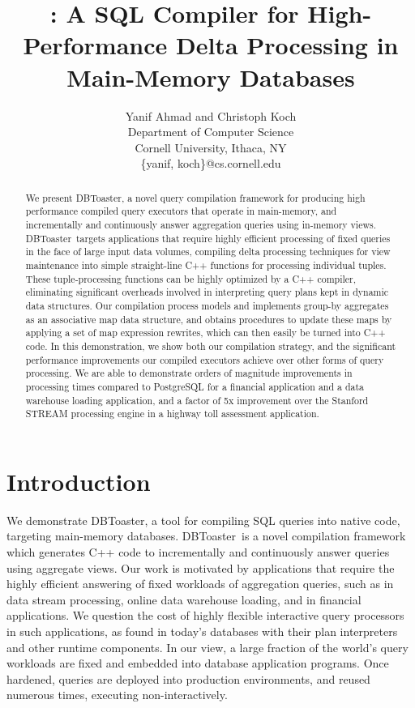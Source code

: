 \documentclass{vldb}
\title{\compiler: A SQL Compiler for High-Performance Delta Processing in
Main-Memory Databases}
\author{Yanif Ahmad and Christoph Koch \\
Department of Computer Science \\ Cornell University, Ithaca, NY \\
\{yanif, koch\}@cs.cornell.edu}
\date{}
\newcommand{\compiler}{DBToaster}
\begin{document}
\maketitle

\begin{abstract}
We present \compiler, a novel query compilation framework for producing high
performance compiled query executors that operate in main-memory, and
incrementally and continuously answer aggregation queries using in-memory views.
\compiler\ targets applications that require highly efficient processing of fixed
queries in the face of large input data volumes, compiling delta processing
techniques for view maintenance into simple straight-line C++ functions for
processing individual tuples. These tuple-processing functions can be highly
optimized by a C++ compiler, eliminating significant overheads involved in
interpreting query plans kept in dynamic data structures. Our compilation process
models and implements group-by aggregates as an associative map data structure,
and obtains procedures to update these maps by applying a set of map expression
rewrites, which can then easily be turned into C++ code. In this demonstration,
we show both our compilation strategy, and the significant performance
improvements our compiled executors achieve over other forms of query processing.
We are able to demonstrate orders of magnitude improvements in processing times
compared to PostgreSQL for a financial application and a data warehouse loading
application, and a factor of 5x improvement over the Stanford STREAM processing
engine in a highway toll assessment application.
\end{abstract}


\section{Introduction}
We demonstrate \compiler, a tool for compiling SQL queries into native code,
targeting main-memory databases. \compiler\ is a novel compilation framework
which generates C++ code to incrementally and continuously answer queries using
aggregate views. Our work is motivated by applications that require the highly
efficient answering of fixed workloads of aggregation queries, such as in data
stream processing, online data warehouse loading, and in financial applications.
We question the cost of highly flexible interactive query processors in such
applications, as found in today's databases with their plan interpreters and
other runtime components. In our view, a large fraction of the world's query
workloads are fixed and embedded into database application programs. Once
hardened, queries are deployed into production environments, and re\-used
numerous times, executing non-interactively.
\end{document}
